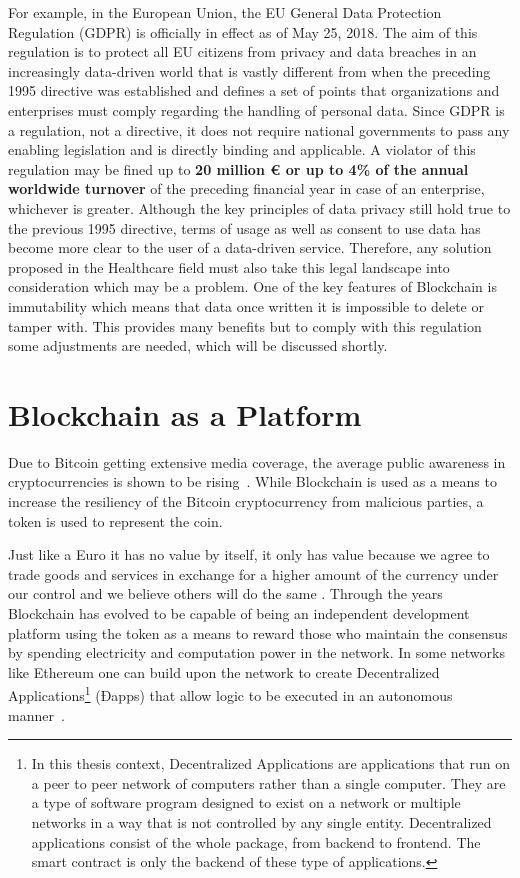 For example, in the European Union, the EU General Data Protection Regulation
(GDPR) is officially in effect as of May 25, 2018. The aim of this regulation
is to protect all EU citizens from privacy and data breaches in an increasingly
data-driven world that is vastly different from when the preceding 1995
directive was established and defines a set of points that organizations and
enterprises must comply regarding the handling of personal data. Since GDPR is
a regulation, not a directive, it does not require national governments to pass
any enabling legislation and is directly binding and applicable. A violator of
this regulation may be fined up to \textbf{20 million € or up to 4\% of the
annual worldwide turnover} of the preceding financial year in case of an
enterprise, whichever is greater. Although the key principles of data privacy
still hold true to the previous 1995 directive, terms of usage as well as
consent to use data has become more clear to the user of a data-driven service.
Therefore, any solution proposed in the Healthcare field must also take this
legal landscape into consideration which may be a problem. One of the key
features of Blockchain is immutability which means that data once written it is
impossible to delete or tamper with. This provides many benefits but to comply
with this regulation some adjustments are needed, which will be discussed
shortly.

\section{Blockchain as a Platform}

Due to Bitcoin getting extensive media coverage, the average public awareness
in cryptocurrencies is shown to be rising~\cite{BitAwareness2017}. While
Blockchain is used as a means to increase the resiliency of the Bitcoin
cryptocurrency from malicious parties, a token is used to represent the coin. 

Just like a Euro it has no value by itself, it only has value because we agree
to trade goods and services in exchange for a higher amount of the currency
under our control and we believe others will do the same \cite{aliessi2016}.
Through the years Blockchain has evolved to be capable of being an independent
development platform using the token as a means to reward those who maintain
the consensus by spending electricity and computation power in the network. In
some networks like Ethereum one can build upon the network to create
Decentralized Applications\footnote{In this thesis context, Decentralized
Applications are applications that run on a peer to peer network of computers
rather than a single computer. They are a type of software program designed to
exist on a network or multiple networks in a way that is not controlled by any
single entity. Decentralized applications consist of the whole package, from
backend to frontend. The smart contract is only the backend of these type of
applications.} (Ðapps) that allow logic to be executed in an autonomous
manner~\cite{Wood2017}. 

